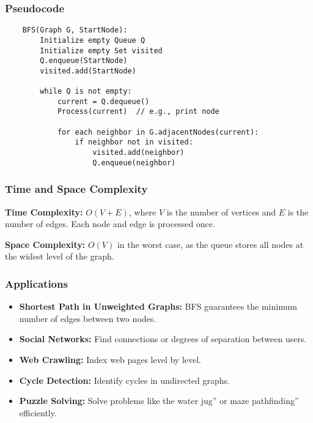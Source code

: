 \subsubsection{Pseudocode}
\begin{lstlisting}
	BFS(Graph G, StartNode):
		Initialize empty Queue Q
		Initialize empty Set visited
		Q.enqueue(StartNode)
		visited.add(StartNode)
	
		while Q is not empty:
			current = Q.dequeue()
			Process(current)  // e.g., print node
	
			for each neighbor in G.adjacentNodes(current):
				if neighbor not in visited:
					visited.add(neighbor)
					Q.enqueue(neighbor)
	\end{lstlisting}

\subsubsection{Time and Space Complexity}
\textbf{Time Complexity:} $O(V + E)$, where $V$ is the number of vertices and $E$ is the number of edges. Each node and edge is processed once.

\textbf{Space Complexity:} $O(V)$ in the worst case, as the queue stores all nodes at the widest level of the graph.

\subsubsection{Applications}
\begin{itemize}
	\item \textbf{Shortest Path in Unweighted Graphs:} BFS guarantees the minimum number of edges between two nodes.
	\item \textbf{Social Networks:} Find connections or degrees of separation between users.
	\item \textbf{Web Crawling:} Index web pages level by level.
	\item \textbf{Cycle Detection:} Identify cycles in undirected graphs.
	\item \textbf{Puzzle Solving:} Solve problems like the water jug'' or maze pathfinding'' efficiently.
\end{itemize}

